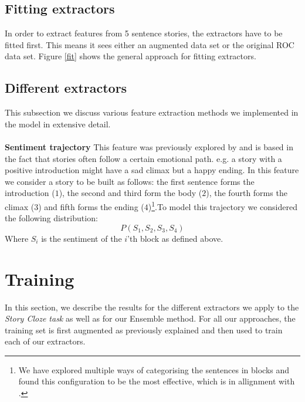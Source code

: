 \documentclass{article}
\begin{document}
\pagebreak
\subsection{Fitting extractors}
In order to extract features from 5 sentence stories, the extractors have to be fitted first. This means it sees either an augmented data set or the original ROC data set. Figure \ref*{fit} shows the general approach for fitting extractors.

\subsection{Different extractors}
This subsection we discuss various feature extraction methods we implemented in the model in extensive detail.\\\\
\textbf{Sentiment trajectory} This feature was previously explored by \cite{COGCOMP} and is based in the fact that stories often follow a certain emotional path. e.g. a story with a positive introduction might have a sad climax but a happy ending. In this feature we consider a story to be built as follows: the first sentence forms the introduction ($1$), the second and third form the body ($2$), the fourth forms the climax ($3$) and fifth forms the ending ($4$)\footnote{We have explored multiple ways of categorising the sentences in blocks and found this configuration to be the most effective, which is in allignment with \cite{COGCOMP}.}.To model this trajectory we considered the following distribution:
\begin{equation}
P(S_1,S_2,S_3,S_4)
\end{equation}
Where $S_i$ is the sentiment of the $i$'th block as defined above.

\section{Training}
\label{sec:training}

In this section, we describe the results for the different extractors we apply
to the {\it Story Cloze task} as well as for our Ensemble method. For all our
approaches, the training set is first augmented as previously explained and then
used to train each of our extractors.
\end{document}
